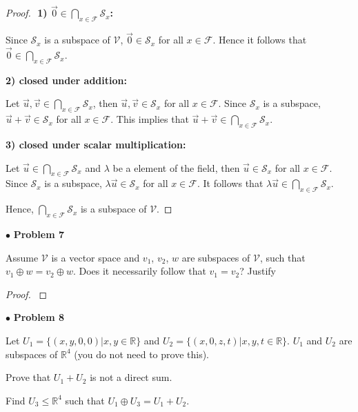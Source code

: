 \documentclass{article}
\begin{document}
\begin{proof}
$ $ \newline
\textbf{1) $\vec{0} \in \bigcap \limits_{x \in \mathcal{F}} \mathcal{S}_{x}$:}

Since $\mathcal{S}_{x}$ is a subspace of $\mathcal{V}$, $\vec{0} \in \mathcal{S}_{x}$ for all $x \in \mathcal{F}$. Hence it follows that $\vec{0} \in \bigcap \limits_{x \in \mathcal{F}} \mathcal{S}_{x}$.
\smallskip

\textbf{2) closed under addition:}

Let $\vec{u}, \vec{v} \in \bigcap \limits_{x \in \mathcal{F}} \mathcal{S}_{x}$, then $\vec{u}, \vec{v} \in \mathcal{S}_{x}$ for all $x \in \mathcal{F}$. Since $\mathcal{S}_{x}$ is a subspace, $\vec{u} + \vec{v} \in \mathcal{S}_{x}$ for all $x \in \mathcal{F}$. This implies that $\vec{u} + \vec{v} \in \bigcap \limits_{x \in \mathcal{F}} \mathcal{S}_{x}$.
\smallskip

\textbf{3) closed under scalar multiplication:}

Let $\vec{u} \in \bigcap \limits_{x \in \mathcal{F}} \mathcal{S}_{x}$ and $\lambda$ be a element of the field, then $\vec{u} \in \mathcal{S}_{x}$ for all $x \in \mathcal{F}$. Since $\mathcal{S}_{x}$ is a subspace, $\lambda \vec{u} \in \mathcal{S}_{x}$ for all $x \in \mathcal{F}$. It follows that $\lambda \vec{u} \in \bigcap \limits_{x \in \mathcal{F}} \mathcal{S}_{x}$.

Hence, $\bigcap \limits_{x \in \mathcal{F}} \mathcal{S}_{x}$ is a subspace of $\mathcal{V}$.
\end{proof}


\newpage
$\bullet$ \textbf{Problem 7}
\medskip

\begin{itshape}
Assume $\mathcal{V}$ is a vector space and $v_{1}$, $v_{2}$, $w$ are subspaces of $\mathcal{V}$, such that $v_{1} \oplus w = v_{2} \oplus w$. Does it necessarily follow that $v_{1}=v_{2}$? Justify
\end{itshape}
\medskip

\begin{proof}
$ $ \newline
\end{proof}


\newpage
$\bullet$ \textbf{Problem 8}
\medskip

\begin{itshape}
Let $U_{1} = \{ (x,y,0,0) | x, y \in \mathbb{R} \}$ and $U_{2} = \{ (x,0,z,t) | x, y, t \in \mathbb{R} \}$. $U_{1}$ and $U_{2}$ are subspaces of $\mathbb{R}^4$ (you do not need to prove this).

Prove that $U_{1} + U_{2}$ is not a direct sum.

Find $U_{3} \le \mathbb{R}^4$ such that $U_{1} \oplus U_{3} = U_{1} + U_{2}$.
\end{itshape}
\medskip
\end{document}

